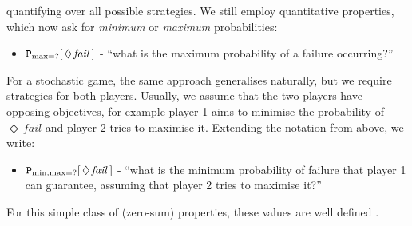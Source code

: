\documentclass{llncs}
\begin{document}
quantifying over all possible strategies.
We still employ quantitative properties,
which now ask for \emph{minimum} or \emph{maximum} probabilities:
\begin{itemize}
\item ${\tt P}_{\max=?}[\,\Diamond\,\mathit{fail}\,]$ -
``what is the maximum probability of a failure occurring?''
\end{itemize}
For a stochastic game, the same approach generalises naturally,
but we require strategies for both players.
Usually, we assume that the two players have opposing objectives,
for example player 1 aims to minimise the probability of $\Diamond\,\mathit{fail}$
and player 2 tries to maximise it.
Extending the notation from above, we write:
\begin{itemize}
\item ${\tt P}_{\min,\max=?}[\,\Diamond\,\mathit{fail}\,]$ -
``what is the minimum probability of failure that player 1 can guarantee,
assuming that player 2 tries to maximise it?''
\end{itemize}
%
For this simple class of (zero-sum) properties,
these values are well defined \cite{Con92}.
\end{document}
